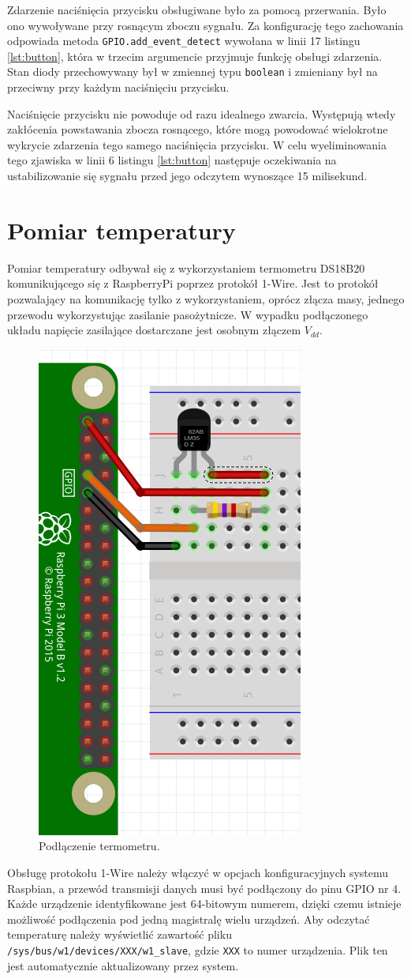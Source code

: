 \documentclass[12pt]{article}
\begin{document}
Zdarzenie naciśnięcia przycisku obsługiwane było za pomocą przerwania. Było ono wywoływane przy rosnącym zboczu sygnału. Za konfigurację tego zachowania odpowiada metoda \lstinline{GPIO.add_event_detect} wywołana w linii 17 listingu \ref{lst:button}, która w trzecim argumencie przyjmuje funkcję obsługi zdarzenia. Stan diody przechowywany był w zmiennej typu \lstinline{boolean} i zmieniany był na przeciwny przy każdym naciśnięciu przycisku.



Naciśnięcie przycisku nie powoduje od razu idealnego zwarcia. Występują wtedy zakłócenia powstawania zbocza rosnącego, które mogą powodować wielokrotne wykrycie zdarzenia tego samego naciśnięcia przycisku. W celu wyeliminowania tego zjawiska w linii 6 listingu \ref{lst:button} następuje oczekiwania na ustabilizowanie się sygnału przed jego odczytem wynoszące 15 milisekund.

\section{Pomiar temperatury}
Pomiar temperatury odbywał się z wykorzystaniem termometru DS18B20\cite{term} komunikującego się z RaspberryPi poprzez protokół 1-Wire. Jest to protokół pozwalający na komunikację tylko z wykorzystaniem, oprócz złącza masy, jednego przewodu wykorzystując zasilanie pasożytnicze. W wypadku podłączonego układu napięcie zasilające dostarczane jest osobnym złączem $V_{dd}$.
\begin{figure}[h]
  \centering
  \includegraphics[height=0.4\linewidth]{sch3}
  \caption{Podłączenie termometru.}
  \label{sch:3}
\end{figure}

Obsługę protokołu 1-Wire należy włączyć w opcjach konfiguracyjnych systemu Raspbian, a przewód transmisji danych musi być podłączony do pinu GPIO nr 4. Każde urządzenie identyfikowane jest 64-bitowym numerem, dzięki czemu istnieje możliwość podłączenia pod jedną magistralę wielu urządzeń. Aby odczytać temperaturę należy wyświetlić zawartość pliku \lstinline{/sys/bus/w1/devices/XXX/w1_slave}, gdzie \lstinline{XXX} to numer urządzenia. Plik ten jest automatycznie aktualizowany przez system.
\end{document}
